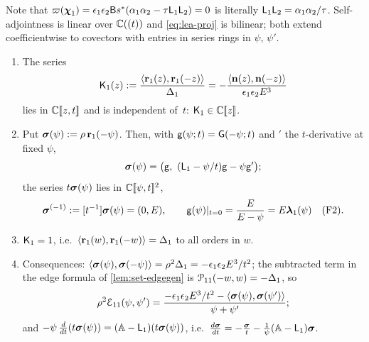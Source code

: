 Note that $\varpi(\boldsymbol{\chi}_1) = \epsilon_1\epsilon_2\mathsf{B}s^{\ast}(\alpha_1\alpha_2 - \tau\mathsf{L}_1\mathsf{L}_2) = 0$ is literally $\mathsf{L}_1\mathsf{L}_2 = \alpha_1\alpha_2/\tau$. Self-adjointness is linear over $\mathbb{C}((t))$ and \eqref{eq:lea-proj} is bilinear; both extend coefficientwise to covectors with entries in series rings in $\psi$, $\psi'$.

\begin{prop}[the symplectic constant $\Kone = 1$]
\label{prop:lea-K1}
\begin{enumerate}
\item The series
\[
\mathsf{K}_{1}(z) := \frac{\langle\mathbf{r}_1(z),\mathbf{r}_1(-z)\rangle}{\Delta_1} = -\frac{\langle\mathbf{n}(z),\mathbf{n}(-z)\rangle}{\epsilon_1\epsilon_2E^3}
\]
lies in $\mathbb{C}[\![ z,t ]\!]$ and is independent of~$t$: $\mathsf{K}_{1}\in\mathbb{C}[\![ z ]\!]$.
\item Put $\boldsymbol{\sigma}(\psi) := \rho\,\mathbf{r}_1(-\psi)$. Then, with $\mathsf{g}(\psi;t) = \mathsf{G}(-\psi;t)$ and $'$ the $t$-derivative at fixed $\psi$,
\[
\boldsymbol{\sigma}(\psi) = \bigl(\mathsf{g},\ (\mathsf{L}_1 - \psi/t)\mathsf{g} - \psi\mathsf{g}'\bigr);
\]
the series $t\boldsymbol{\sigma}(\psi)$ lies in $\mathbb{C}[\![ \psi,t ]\!]^2$,
\[
\boldsymbol{\sigma}^{(-1)} := [t^{-1}]\boldsymbol{\sigma}(\psi) = (0,E),\qquad \mathsf{g}(\psi)|_{t=0} = \frac{E}{E-\psi} = E\boldsymbol{\lambda}_1(\psi)\quad\text{(F2)}.
\]
\item $\Kone = 1$, i.e.\ $\langle\mathbf{r}_1(w),\mathbf{r}_1(-w)\rangle = \Delta_1$ to all orders in $w$.
\item Consequences: $\langle\boldsymbol{\sigma}(\psi),\boldsymbol{\sigma}(-\psi)\rangle = \rho^2\Delta_1 = -\epsilon_1\epsilon_2E^3/t^2$; the subtracted term in the edge formula of \cref{lem:set-edgegen} is $\mathcal{P}_{11}(-w,w) = -\Delta_1$, so
\begin{equation}
\label{eq:lea-E11sigma}
\rho^2\mathcal{E}_{11}(\psi,\psi') = \frac{-\epsilon_1\epsilon_2E^3/t^2 - \langle\boldsymbol{\sigma}(\psi),\boldsymbol{\sigma}(\psi')\rangle}{\psi+\psi'};
\end{equation}
and $-\psi\,\frac{d}{dt}(t\boldsymbol{\sigma}(\psi)) = (\mathbb{A}-\mathsf{L}_1)(t\boldsymbol{\sigma}(\psi))$, i.e.\ $\frac{d\boldsymbol{\sigma}}{dt} = -\frac{\boldsymbol{\sigma}}{t} - \frac{1}{\psi}(\mathbb{A}-\mathsf{L}_1)\boldsymbol{\sigma}$.
\end{enumerate}
\end{prop}

